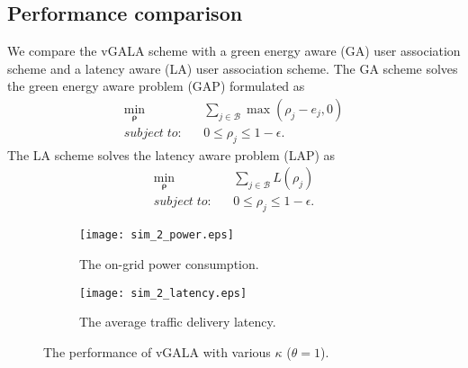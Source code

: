 \documentclass[journal]{IEEEtran}
\theoremstyle{definition}
\begin{document}
\subsection{Performance comparison}
We compare the vGALA scheme with a green energy aware (GA) user association scheme and a latency aware (LA) user association scheme. The GA scheme solves the green energy aware problem (GAP) formulated as
\begin{eqnarray}
\label{eq:obj_gap}
\min_{\boldsymbol{\rho}} && \sum_{j \in \mathcal{B}}\max(\rho_{j}-e_{j},0)\\
\label{eq:constraint_gap}
subject\; to: && 0\leq\rho_{j}\leq 1-\epsilon.
\end{eqnarray}
The LA scheme solves the latency aware problem (LAP) as
\begin{eqnarray}
\label{eq:obj_lap}
\min_{\boldsymbol{\rho}} && \sum_{j \in \mathcal{B}}L(\rho_{j})\\
\label{eq:constraint_lap}
subject\; to: && 0\leq\rho_{j}\leq 1-\epsilon.
\end{eqnarray}

\begin{figure*}
\centering
\hspace*{\fill}
    \begin{subfigure}[b]{0.5\textwidth}
            \texttt{[image: sim\_2\_power.eps]}
            \caption{The on-grid power consumption.}
            \label{fig:sim_2_power}
    \end{subfigure}\begin{subfigure}[b]{0.5\textwidth}
            \texttt{[image: sim\_2\_latency.eps]}
            \caption{The average traffic delivery latency.}
            \label{fig:sim_2_latency}
   \end{subfigure}\hfill
    \caption{The performance of vGALA with various $\kappa$ ($\theta=1$).
     }\label{fig:sim_2_power_latency}
   \vspace{-16pt}
\end{figure*}
\end{document}
